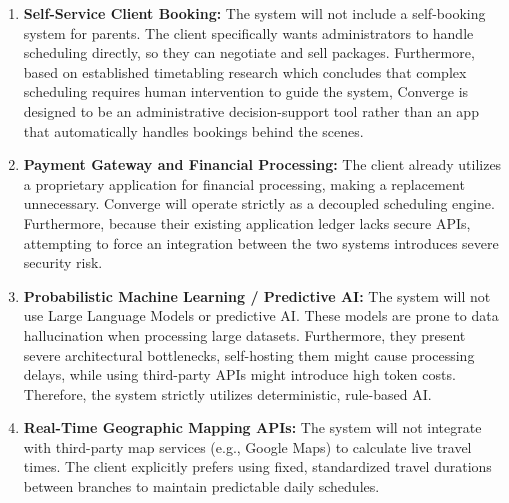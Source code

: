 \begin{enumerate}
    \item \textbf{Self-Service Client Booking:} The system will not include a self-booking system for parents. The client specifically wants administrators to handle scheduling directly, so they can negotiate and sell packages. Furthermore, based on established timetabling research which concludes that complex scheduling requires human intervention to guide the system\cite{schaerf1999}, Converge is designed to be an administrative decision-support tool rather than an app that automatically handles bookings behind the scenes.
    \item \textbf{Payment Gateway and Financial Processing:} The client already utilizes a proprietary application for financial processing, making a replacement unnecessary. Converge will operate strictly as a decoupled scheduling engine. Furthermore, because their existing application ledger lacks secure APIs, attempting to force an integration between the two systems introduces severe security risk.
    \item \textbf{Probabilistic Machine Learning / Predictive AI:} The system will not use Large Language Models or predictive AI. These models are prone to data hallucination when processing large datasets. Furthermore, they present severe architectural bottlenecks, self-hosting them might cause processing delays, while using third-party APIs might introduce high token costs. Therefore, the system strictly utilizes deterministic, rule-based AI.
    \item \textbf{Real-Time Geographic Mapping APIs:} The system will not integrate with third-party map services (e.g., Google Maps) to calculate live travel times. The client explicitly prefers using fixed, standardized travel durations between branches to maintain predictable daily schedules.
\end{enumerate}

